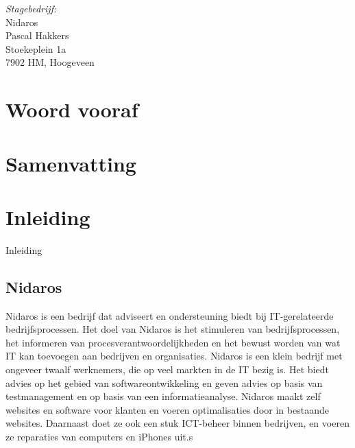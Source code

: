 \documentclass[a4paper,11pt,oneside]{report}
\begin{document}
\emph{Stagebedrijf:}\\
  Nidaros\\
	Pascal Hakkers\\
	Stoekeplein 1a\\
	7902 HM, Hoogeveen



\chapter*{Woord vooraf}
\lipsum[1]

\chapter*{Samenvatting}
\lipsum[1]





\newpage
\renewcommand*\contentsname{Inhoud}
\tableofcontents
\cleardoublepage
{}





\chapter{Inleiding}
Inleiding


\section{Nidaros}
Nidaros is een bedrijf dat adviseert en ondersteuning biedt bij IT-gerelateerde
bedrijfsprocessen. Het doel van Nidaros is het stimuleren van bedrijfsprocessen,
het informeren van procesverantwoordelijkheden en het bewust worden van wat IT
kan toevoegen aan bedrijven en organisaties. Nidaros is een klein bedrijf met
ongeveer twaalf werknemers, die op veel markten in de IT bezig is. Het biedt
advies op het gebied van softwareontwikkeling en geven advies op basis van
testmanagement en op basis van een informatieanalyse. Nidaros maakt zelf
websites en software voor klanten en voeren optimalisaties door in bestaande
websites. Daarnaast doet ze ook een stuk ICT-beheer binnen bedrijven, en voeren
ze reparaties van computers en iPhones uit.s
\end{document}
